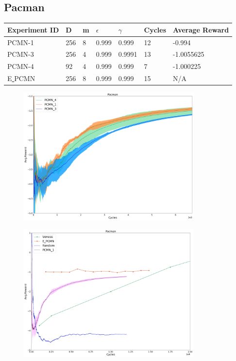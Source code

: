 \documentclass{article}
\theoremstyle{definition}
\newtheorem{primary statistics}[definition]{Primary Statistics}
\newtheorem{auxiliary statistics}[definition]{Auxiliary Statistics}
\begin{document}
\newpage

\subsection{Pacman}
 \begin{tabular}{|l|l|l|l|l|l|l|}
 \hline \centering
 Experiment ID& D & m & $\epsilon$ & $\gamma$ & Cycles & Average Reward \\ \hline
PCMN-1  & 256       & 8           & 0.999       & 0.999             & 12     & -0.994        \\ \hline
 PCMN-3    & 256       & 4           & 0.999       & 0.9991            & 13     & -1.0055625       \\ \hline
 PCMN-4     & 92        & 4           & 0.999       & 0.999             & 7      &    -1.000225    \\  \hline 
  E\underline{ }PCMN    & 256        & 8           & 0.999       & 0.999             & 15      &    N/A    \\  \hline     
\end{tabular}



 \begin{figure}[h]
 \centering
    \includegraphics[width=9.3cm]{4_Pacman}
\end{figure}

 \begin{figure}[h]
 \centering
    \includegraphics[width=9.3cm]{Pacman}
\end{figure}
\end{document}
